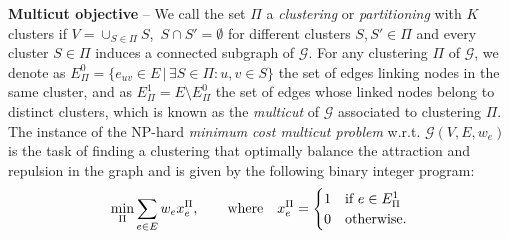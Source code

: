 \textbf{Multicut objective} -- We call the set $\Pi$ a \emph{clustering} or \emph{partitioning} with $K$ clusters if $V = \cup_{S\in\Pi} S $, $\,S \cap S' = \emptyset$ for different clusters $S, S'\in \Pi$ and every cluster $S \in \Pi$ induces a connected subgraph of $\mathcal{G}$. 
For any clustering $\Pi$ of $\mathcal{G}$, we denote as $E^0_\Pi= \{ e_{uv} \in E \,|\, \exists S \in \Pi : u,v \in S \}$ the set of edges linking nodes in the same cluster, and as $E_\Pi^1= E \setminus E^0_\Pi$ the set of edges whose linked nodes belong to distinct clusters, which is known as the \emph{multicut} of $\mathcal{G}$ associated to clustering $\Pi$. The instance of the NP-hard \emph{minimum cost multicut problem} w.r.t. $\mathcal{G}(V,E,w_e)$ is the task of finding a clustering that optimally balance the attraction and repulsion in the graph and is given by the following binary integer program:
\begin{equation}\label{eq:MC_objective}
 \min_\Pi \sum_{e\in E} w_e x_e^\Pi,  \qquad \text{where} \quad x^\Pi_e = 
 \begin{cases} 
 1 & \text{if } e\in E^1_\Pi \\
 0 & \text{otherwise}.
 \end{cases}
\end{equation}


